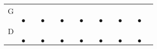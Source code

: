 \documentclass[landscape]{foils}
\begin{document}
{\begin{center}
\begin{tabular}{ccccccccccccccc}
G  & {\color{black} $$} &     & {\color{black} $$ } &     & {\color{black} $$ } & {\color{black} $$} &     & {\color{black} $$ } &     & {\color{black} $$ } & {\color{black} $$} &     & {\color{black} $$ } &       \\   & {\color{black} $\bullet$}      &    & {\color{black} $\bullet$}        &    & {\color{black}$\bullet$} &    & {\color{black}$\bullet$}&    & {\color{black}$\bullet$}&    & {\color{black}$\bullet$}&    & {\color{black}$\bullet$} \\
D  & {\color{black} $$} &     & {\color{black} $$ } &     & {\color{black} $$ } & {\color{black} $$} &     & {\color{black} $$ } &     & {\color{black} $$ } & {\color{black} $$} &     & {\color{black} $$ } &       \\   & {\color{black} $\bullet$}      &    & {\color{black} $\bullet$}        &    & {\color{black}$\bullet$} &    & {\color{black}$\bullet$}&    & {\color{black}$\bullet$}&    & {\color{black}$\bullet$}&    & {\color{black}$\bullet$} \\
\end{tabular}
\end{center}
}
\end{document}
